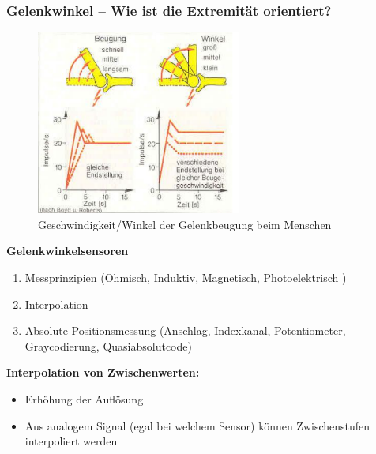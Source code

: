\subsubsection{Gelenkwinkel – Wie ist die Extremität orientiert?}
\begin{figure}[h!]
	\centering
	\includegraphics[width=0.6\textwidth]{figures/ch04_gelenkwink.png}
	\caption{Geschwindigkeit/Winkel der Gelenkbeugung beim Menschen}
	\label{gelwink}
\end{figure}
\textbf{Gelenkwinkelsensoren}
\begin{enumerate}
\setlength\itemsep{0em}
\item Messprinzipien (Ohmisch, Induktiv, Magnetisch, Photoelektrisch )
\item Interpolation
\item Absolute Positionsmessung (Anschlag, Indexkanal, Potentiometer, Graycodierung, Quasiabsolutcode)
\end{enumerate}

\textbf{Interpolation von Zwischenwerten:}
\begin{itemize}
\setlength\itemsep{0em}
\item Erhöhung der Auflösung
\item Aus analogem Signal (egal bei welchem Sensor) können Zwischenstufen interpoliert werden
\end{itemize}

